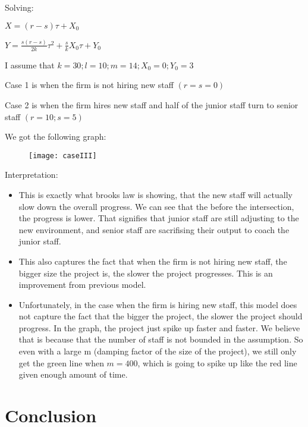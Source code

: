 \documentclass{article}
\newenvironment{atomize}
    {\begin{list} {} {
            \setlength\itemindent{0pt}
            \setlength\leftmargin{10pt}
            \setlength\labelwidth{0pt}
    }}
    {\end{list}}
\begin{document}
\begin{atomize}
\begin{atomize}
					\item Solving: 
							\begin{atomize}
								\item $X = (r-s)\tau + X_{0}$
								\item $Y = \frac{s(r-s)}{2k}\tau^{2} + \frac{s}{k}X_{0}\tau + Y_{0}$
								\item I assume that $k = 30; l = 10; m = 14; X_{0} = 0; Y_{0} = 3$ 
                \item Case 1 is when the firm is not hiring new staff $(r = s = 0)$
                \item Case 2 is when the firm hires new staff and half of the junior staff turn to senior staff $(r=10; s=5)$
                \item We got the following graph:
							\end{atomize}
 		       \item 
    		      \begin{figure}[H]
        	    \centering
          	  \texttt{[image: caseIII]}
         	 \end{figure}

          \item Interpretation:
            \begin{itemize}
              \item This is exactly what brooks law is showing, that the new staff will actually slow down the overall progress. We can see that the before the intersection, the progress is lower. That signifies that junior staff are still adjusting to the new environment, and senior staff are sacrifising their output to coach the junior staff. 

              \item This also captures the fact that when the firm is not hiring new staff, the bigger size the project is, the slower the project progresses. This is an improvement from previous model.

              \item Unfortunately, in the case when the firm is hiring new staff, this model does not capture the fact that the bigger the project, the slower the project should progress. In the graph, the project just spike up faster and faster. We believe that is because that the number of staff is not bounded in the assumption. So even with a large m (damping factor of the size of the project), we still only get the green line when $m=400$, which is going to spike up like the red line given enough amount of time. 

            \end{itemize}


				\end{atomize}
			
		\end{atomize}

  \section*{Conclusion}
		
\end{document}
